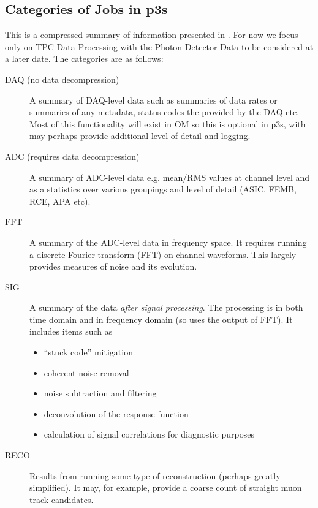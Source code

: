 \documentclass[pdftex,12pt,letter]{article}
\begin{document}
\subsection{Categories of Jobs in p3s}
\label{sec:categories}

This is a compressed summary of information presented in \cite{docdb1811}.
For now we focus only on TPC Data Processing with the Photon Detector Data
to be considered at a later date. The categories are as follows:

\begin{description}

\item[DAQ (no data decompression)] A summary of DAQ-level data  such as summaries of data
 rates  or summaries of any metadata, status codes the provided by the DAQ etc.
Most of this functionality will exist in OM so this is optional in p3s, with may perhaps
provide additional level of detail and logging.

\item[ADC (requires data decompression)] A summary of ADC-level data e.g. mean/RMS
values at channel level and as a statistics over various groupings and level of detail
(ASIC, FEMB, RCE, APA etc).


\item[FFT] A summary of the ADC-level data in frequency space. It requires running a discrete Fourier
transform (FFT) on channel waveforms. This largely  provides measures of noise and its
evolution.

\item[SIG] A summary of the data \textit{after signal processing}.
The processing is in  both time domain and in frequency domain (so uses the output of FFT).
It includes items such as
\begin{itemize}
\item ``stuck code'' mitigation
\item coherent noise removal
\item noise subtraction and filtering
\item deconvolution of the response function
\item calculation of signal correlations for diagnostic purposes
\end{itemize}

\item[RECO] Results from running some type of reconstruction (perhaps greatly simplified).
It may, for  example, provide a coarse count of straight muon track candidates.

\end{description}
\end{document}
